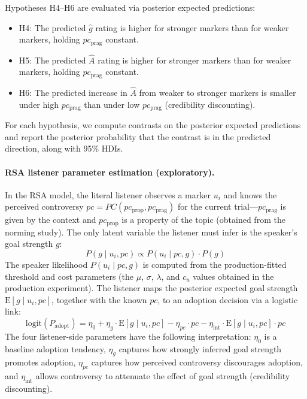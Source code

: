 \documentclass[12pt]{article}
\begin{document}
Hypotheses H4--H6 are evaluated via posterior expected predictions:
\begin{itemize}
    \item H4: The predicted $\hat{g}$ rating is higher for stronger markers than for weaker markers, holding $pc_{\text{prag}}$ constant.
    \item H5: The predicted $\hat{A}$ rating is higher for stronger markers than for weaker markers, holding $pc_{\text{prag}}$ constant.
    \item H6: The predicted increase in $\hat{A}$ from weaker to stronger markers is smaller under high $pc_{\text{prag}}$ than under low $pc_{\text{prag}}$ (credibility discounting).
\end{itemize}

For each hypothesis, we compute contrasts on the posterior expected predictions and report the posterior probability that the contrast is in the predicted direction, along with 95\% HDIs.

\paragraph{RSA listener parameter estimation (exploratory).}
In the RSA model, the literal listener observes a marker $u_i$ and knows the perceived controversy $pc = PC(pc_{\text{prop}}, pc_{\text{prag}})$ for the current trial---$pc_{\text{prag}}$ is given by the context and $pc_{\text{prop}}$ is a property of the topic (obtained from the norming study). The only latent variable the listener must infer is the speaker's goal strength $g$:
\begin{equation}
P(g \mid u_i, pc) \propto P(u_i \mid pc, g) \cdot P(g)
\end{equation}
The speaker likelihood $P(u_i \mid pc, g)$ is computed from the production-fitted threshold and cost parameters (the $\mu$, $\sigma$, $\lambda$, and $c_u$ values obtained in the production experiment). The listener maps the posterior expected goal strength $\mathrm{E}[g \mid u_i, pc]$, together with the known $pc$, to an adoption decision via a logistic link:
\begin{equation}
\text{logit}(P_{\text{adopt}}) = \eta_0 + \eta_g \cdot \mathrm{E}[g \mid u_i, pc] - \eta_{pc} \cdot pc - \eta_{\text{int}} \cdot \mathrm{E}[g \mid u_i, pc] \cdot pc
\end{equation}
The four listener-side parameters have the following interpretation: $\eta_0$ is a baseline adoption tendency, $\eta_g$ captures how strongly inferred goal strength promotes adoption, $\eta_{pc}$ captures how perceived controversy discourages adoption, and $\eta_{\text{int}}$ allows controversy to attenuate the effect of goal strength (credibility discounting).
\end{document}
